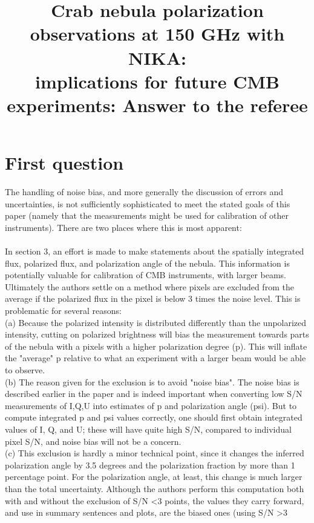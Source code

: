 \documentclass[report,twocolumn]{aa}
\begin{document}
\title{Crab nebula polarization observations at 150 GHz with NIKA: \\ implications for future CMB experiments: Answer to the referee}

\section{First question}

The handling of noise bias, and more generally the discussion of
errors and uncertainties, is not sufficiently sophisticated to meet the
stated goals of this paper (namely that the measurements might be used
for calibration of other instruments). There are two places where
this is most apparent:
\\ \\
In section 3, an effort is made to make statements about the spatially
integrated flux, polarized flux, and polarization angle of the nebula.
This information is potentially valuable for calibration of CMB
instruments, with larger beams. Ultimately the authors settle on a
method where pixels are excluded from the average if the polarized
flux in the pixel is below 3 times the noise level. This is
problematic for several reasons:\\
(a) Because the polarized intensity is distributed differently than
the unpolarized intensity, cutting on polarized brightness will bias
the measurement towards parts of the nebula with a pixels with a
higher polarization degree (p). This will inflate the "average" p
relative to what an experiment with a larger beam would be able to
observe.\\
(b) The reason given for the exclusion is to avoid "noise bias". The
noise bias is described earlier in the paper and is indeed important
when converting low S/N measurements of I,Q,U into estimates of p and
polarization angle (psi). But to compute integrated p and psi values
correctly, one should first obtain integrated values of I, Q, and U;
these will have quite high S/N, compared to individual pixel S/N, and
noise bias will not be a concern.\\
(c) This exclusion is hardly a minor technical point, since it changes
the inferred polarization angle by 3.5 degrees and the polarization
fraction by more than 1 percentage point. For the polarization angle,
at least, this change is much larger than the total uncertainty.
Although the authors perform this computation both with and without
the exclusion of S/N \textless 3 points, the values they carry forward, and
use in summary sentences and plots, are the biased ones (using S/N \textgreater 3
\end{document}
